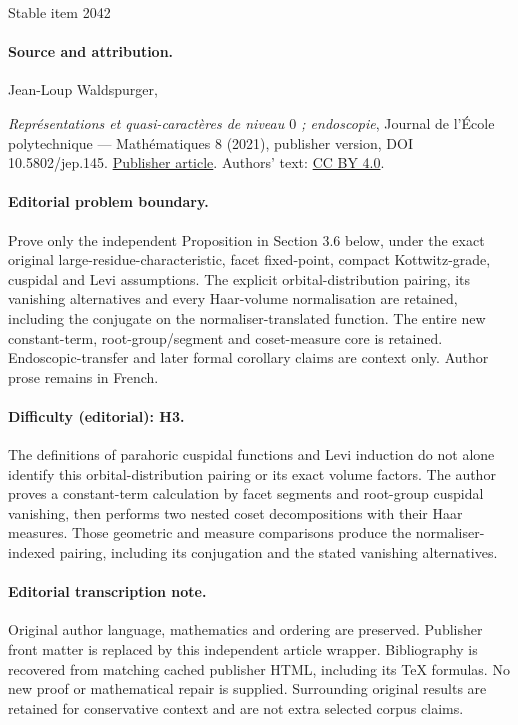 \documentclass[11pt]{article}
\numberwithin{equation}{section}\providecommand{\og}{«\,}\providecommand{\fg}{\,»}
\theoremstyle{plain}
\theoremstyle{definition}
\begin{document}
\begin{center}{\Large Stable item 2042}\end{center}
\paragraph{Source and attribution.}
Jean-Loup Waldspurger,\par\emph{Représentations et quasi-caractères de niveau $0$ ; endoscopie}, Journal de l’École polytechnique — Mathématiques 8 (2021), publisher version, DOI 10.5802/jep.145. \href{https://jep.centre-mersenne.org/articles/10.5802/jep.145/}{Publisher article}. Authors' text: \href{https://creativecommons.org/licenses/by/4.0/}{CC BY 4.0}.
\paragraph{Editorial problem boundary.}
Prove only the independent Proposition in Section 3.6 below, under the exact original large-residue-characteristic, facet fixed-point, compact Kottwitz-grade, cuspidal and Levi assumptions. The explicit orbital-distribution pairing, its vanishing alternatives and every Haar-volume normalisation are retained, including the conjugate on the normaliser-translated function. The entire new constant-term, root-group/segment and coset-measure core is retained. Endoscopic-transfer and later formal corollary claims are context only. Author prose remains in French.
\paragraph{Difficulty (editorial): H3.}
The definitions of parahoric cuspidal functions and Levi induction do not alone identify this orbital-distribution pairing or its exact volume factors. The author proves a constant-term calculation by facet segments and root-group cuspidal vanishing, then performs two nested coset decompositions with their Haar measures. Those geometric and measure comparisons produce the normaliser-indexed pairing, including its conjugation and the stated vanishing alternatives.
\paragraph{Editorial transcription note.}
Original author language, mathematics and ordering are preserved. Publisher front matter is replaced by this independent article wrapper. Bibliography is recovered from matching cached publisher HTML, including its TeX formulas. No new proof or mathematical repair is supplied. Surrounding original results are retained for conservative context and are not extra selected corpus claims.
\clearpage
\end{document}
